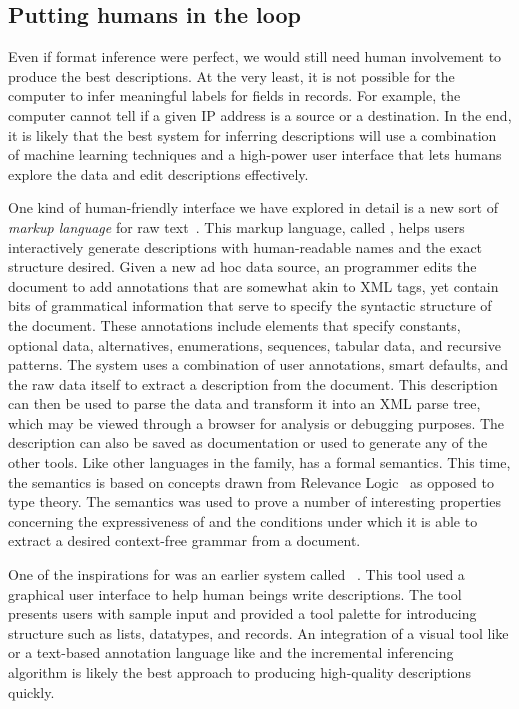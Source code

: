 \documentclass{sig-alternate}
\begin{document}
\subsection{Putting humans in the loop}
Even if format inference were perfect, we would still need human
involvement to produce the best descriptions.  At the very least, it
is not possible for the computer to infer meaningful labels for fields
in records.  For example, the computer cannot tell if a given IP
address is a source or a destination.  In the end, it is likely that the
best system for inferring descriptions will use a combination of
machine learning techniques and a high-power user interface that lets
humans explore the data and edit descriptions effectively.

One kind of human-friendly interface we have explored in detail
is a new sort of {\em markup language} for raw text~\cite{xi+:anne}.  This
markup language, called \anne{}, helps users 
interactively generate \pads{} descriptions with human-readable names
and the exact structure desired.  Given a new ad
hoc data source, an \anne{} programmer edits the document to add
annotations that are somewhat akin to XML tags, yet contain bits of
grammatical information that serve to specify the syntactic
structure of the document. 
These annotations include elements that specify constants,
optional data, alternatives, enumerations, sequences, tabular data,
and recursive patterns. The \anne{} system uses a combination of
user annotations, smart defaults, and the raw data itself to extract a \pads{}
description from the document. This \pads{} description can then
be used to parse the data and transform it into an XML parse tree,
which may be viewed through a browser for analysis or debugging
purposes.  The description can also be saved as documentation
or used to generate any of the other \pads{} tools.  Like other
languages in the \pads{} family, \anne{} has a formal semantics.
This time, the semantics is based on concepts drawn from
Relevance Logic~\cite{anderson+:relevance-logic} as opposed to type theory.  The semantics was used to prove a number of
interesting properties concerning the expressiveness of 
\anne{} and the conditions under which it is able 
to extract a desired context-free grammar from a document.

One of the inspirations for \anne{} was an earlier system called
\launchpads{}~\cite{planx06:launchpads}. This tool used a graphical user
interface to help human beings write descriptions.  The tool 
presents users with sample input and provided a tool palette for
introducing structure such as lists, datatypes, and records.  An
integration of a visual tool like \launchpads{} or a text-based
annotation language like \anne{} and the incremental
inferencing algorithm is likely the best approach to producing
high-quality descriptions quickly.
   
\end{document}
